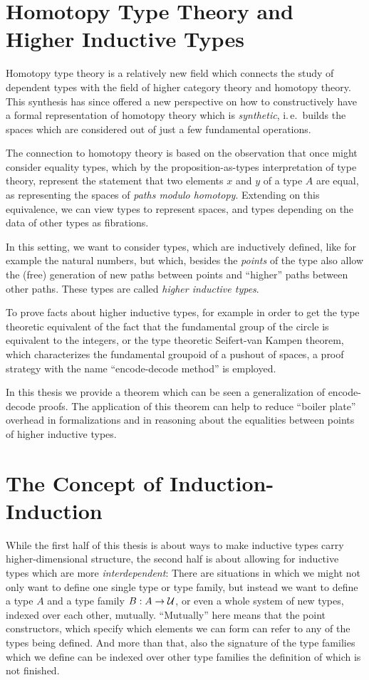 \section{Homotopy Type Theory and Higher Inductive Types}

Homotopy type theory is a relatively new field which connects the study of
dependent types with the field of higher category theory and homotopy theory.
This synthesis has since offered a new perspective on how to constructively
have a formal representation of homotopy theory which is \emph{synthetic},
i.\,e.\ builds the spaces which are considered out of just a few fundamental
operations.

The connection to homotopy theory is based on the observation that once might
consider equality types, which by the proposition-as-types interpretation of type
theory, represent the statement that two elements $x$ and $y$ of a type $A$
are equal, as representing the spaces of \emph{paths modulo homotopy}.
Extending on this equivalence, we can view types to represent spaces,
and types depending on the data of other types as fibrations.

In this setting, we want to consider types, which are inductively defined,
like for example the natural numbers, but which, besides the \emph{points}
of the type also allow the (free) generation of new paths between points
and ``higher'' paths between
other paths.
These types are called \emph{higher inductive types}.

To prove facts about higher inductive types, for example in order to get the
type theoretic equivalent of the fact that the fundamental group of the circle
is equivalent to the integers, or the type theoretic Seifert-van Kampen theorem,
which characterizes the fundamental groupoid of a pushout of spaces,
a proof strategy with the name ``encode-decode method'' is employed.

In this thesis we provide a theorem which can be seen a generalization of
encode-decode proofs.
The application of this theorem can help to reduce ``boiler plate'' overhead
in formalizations and in reasoning about the equalities between points
of higher inductive types.

\section{The Concept of Induction-Induction}

While the first half of this thesis is about ways to make inductive types carry
higher-dimensional structure, the second half is about allowing for inductive types
which are more \emph{interdependent}:
There are situations in which we might not only want to define one single type
or type family, but instead we want to define a type $A$ and a type family $B : A \to \mathcal{U}$,
or even a whole system of new types, indexed over each other,
mutually.
``Mutually'' here means that the point constructors, which specify which elements
we can form can refer to any of the types being defined.
And more than that, also the signature of the type families which we define can
be indexed over other type families the definition of which is not finished.

